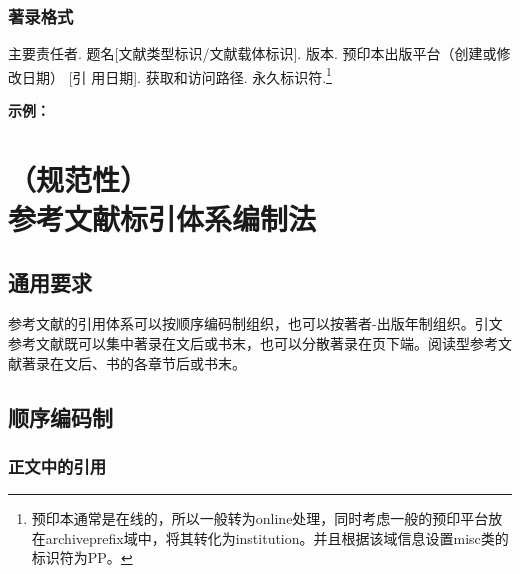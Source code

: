 \documentclass[twoside]{article}%
\begin{document}
\subsubsection{著录格式}

主要责任者. 题名[文献类型标识/文献载体标识]. 版本. 预印本出版平台（创建或修改日期） [引
用日期]. 获取和访问路径. 永久标识符.\footnote{预印本通常是在线的，所以一般转为online处理，同时考虑一般的预印平台放在archiveprefix域中，将其转化为institution。并且根据该域信息设置misc类的标识符为PP。}

\begin{refsection}
\nocite{方向明2023元宇宙,肖玲2024数据,山东一医大2025,BLOSS2025trial,JENKINS2012light}


\textbf{示例：}

{\printbibliography[heading=none,env=indentegenv]}

\end{refsection}


\newpage
\appendix

\section[参考文献标引体系编制法]{（规范性）\\参考文献标引体系编制法}

\subsection{通用要求}

参考文献的引用体系可以按顺序编码制组织，也可以按著者-出版年制组织。引文参考文献既可以集中著录在文后或书末，也可以分散著录在页下端。阅读型参考文献著录在文后、书的各章节后或书末。

\subsection{顺序编码制}\label{sec:ref:numeric}

\subsubsection{正文中的引用}\label{sec:numeric:cite}
\end{document}
